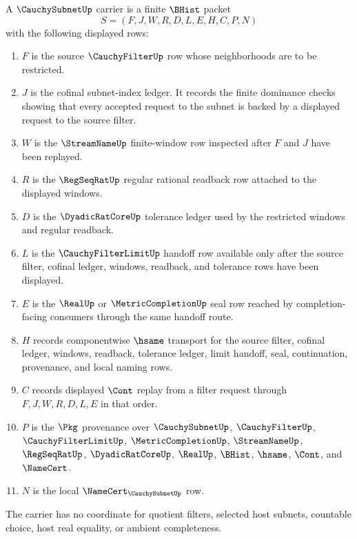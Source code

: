 \begin{definition}
\label{def:cauchy-subnet-carrier}
A $\CauchySubnetUp$ carrier is a finite $\BHist$ packet
$$
S=(F,J,W,R,D,L,E,H,C,P,N)
$$
with the following displayed rows:
\begin{enumerate}
\item $F$ is the source $\CauchyFilterUp$ row whose neighborhoods are to be restricted.
\item $J$ is the cofinal subnet-index ledger. It records the finite dominance checks showing that every accepted request to the subnet is backed by a displayed request to the source filter.
\item $W$ is the $\StreamNameUp$ finite-window row inspected after $F$ and $J$ have been replayed.
\item $R$ is the $\RegSeqRatUp$ regular rational readback row attached to the displayed windows.
\item $D$ is the $\DyadicRatCoreUp$ tolerance ledger used by the restricted windows and regular readback.
\item $L$ is the $\CauchyFilterLimitUp$ handoff row available only after the source filter, cofinal ledger, windows, readback, and tolerance rows have been displayed.
\item $E$ is the $\RealUp$ or $\MetricCompletionUp$ seal row reached by completion-facing consumers through the same handoff route.
\item $H$ records componentwise $\hsame$ transport for the source filter, cofinal ledger, windows, readback, tolerance ledger, limit handoff, seal, continuation, provenance, and local naming rows.
\item $C$ records displayed $\Cont$ replay from a filter request through $F,J,W,R,D,L,E$ in that order.
\item $P$ is the $\Pkg$ provenance over $\CauchySubnetUp$, $\CauchyFilterUp$, $\CauchyFilterLimitUp$, $\MetricCompletionUp$, $\StreamNameUp$, $\RegSeqRatUp$, $\DyadicRatCoreUp$, $\RealUp$, $\BHist$, $\hsame$, $\Cont$, and $\NameCert$.
\item $N$ is the local $\NameCert_{\CauchySubnetUp}$ row.
\end{enumerate}
The carrier has no coordinate for quotient filters, selected host subnets, countable choice, host real equality, or ambient completeness.
\end{definition}


